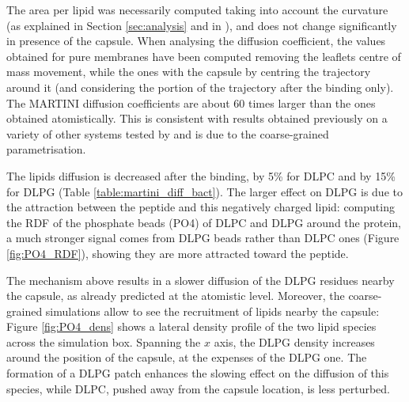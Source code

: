 %
The area per lipid was necessarily computed taking into account the curvature (as explained in Section \ref{sec:analysis} and in \citet{Braun2011}), and does not change significantly in presence of the capsule.
%
When analysing the diffusion coefficient, the values obtained for pure membranes have been computed removing the leaflets centre of mass movement, while the ones with the capsule by centring the trajectory around it (and considering the portion of the trajectory after the binding only). The MARTINI diffusion coefficients are about 60 times larger than the ones obtained atomistically. This is consistent with results obtained previously on a variety of other systems tested by \citet{Venable2017} and is due to the coarse-grained parametrisation.

The lipids diffusion is decreased after the binding, by 5\% for DLPC and by 15\% for DLPG (Table \ref{table:martini_diff_bact}). The larger effect on DLPG is due to the attraction between the peptide and this negatively charged lipid: computing the RDF of the phosphate beads (PO4) of DLPC and DLPG around the protein, a much stronger signal comes from DLPG beads rather than DLPC ones (Figure \ref{fig:PO4_RDF}), showing they are more attracted toward the peptide.

The mechanism above results in a slower diffusion of the DLPG residues nearby the capsule, as already predicted at the atomistic level. Moreover, the coarse-grained simulations allow to see the recruitment of lipids nearby the capsule: Figure \ref{fig:PO4_dens} shows a lateral density profile of the two lipid species across the simulation box. Spanning the $x$ axis, the DLPG density increases around the position of the capsule, at the expenses of the DLPG one. The formation of a DLPG patch enhances the slowing effect on the diffusion of this species, while DLPC, pushed away from the capsule location, is less perturbed.

